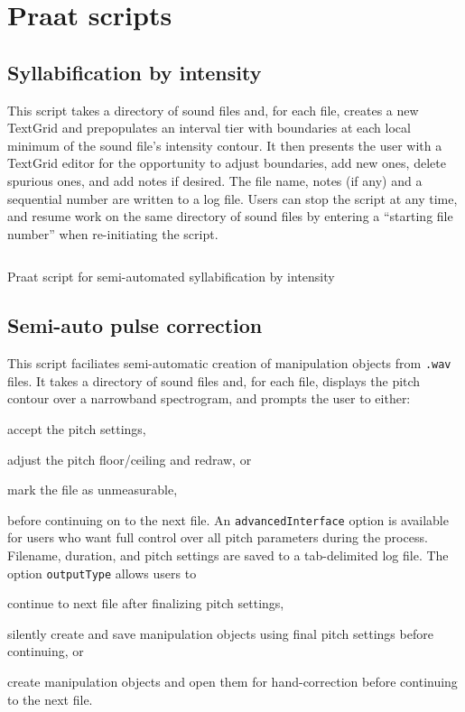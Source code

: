 \chapter{Praat scripts\label{apx:PraatScripts}}

\section{Syllabification by intensity}
This script takes a directory of sound files and, for each file, creates a new TextGrid and prepopulates an interval tier with boundaries at each local minimum of the sound file’s intensity contour.  It then presents the user with a TextGrid editor for the opportunity to adjust boundaries, add new ones, delete spurious ones, and add notes if desired.  The file name, notes (if any) and a sequential number are written to a log file.  Users can stop the script at any time, and resume work on the same directory of sound files by entering a “starting file number” when re-initiating the script.

\begin{code}
	\inputminted[fontsize=\footnotesize, tabsize=2]{r}{../scripts/CreateSyllableTierFromIntensity_DissVersion.praat}
	\caption[Syllabification by intensity]{Praat script for semi-automated syllabification by intensity\label{lst:SylInt}}
\end{code}
\newpage

\section{Semi-auto pulse correction}
This script faciliates semi-automatic creation of manipulation objects from \texttt{.wav} files.  It takes a directory of sound files and, for each file, displays the pitch contour over a narrowband spectrogram, and prompts the user to either:
\begin{inparaenum}
	\item accept the pitch settings, 
	\item adjust the pitch floor/ceiling and redraw, or
	\item mark the file as unmeasurable,
\end{inparaenum}
before continuing on to the next file.  An \texttt{advancedInterface} option is available for users who want full control over all pitch parameters during the process.  Filename, duration, and pitch settings are saved to a tab-delimited log file.  The option \texttt{outputType} allows users to 
\begin{inparaenum}
\item continue to next file after finalizing pitch settings,
\item silently create and save manipulation objects using final pitch settings before continuing, or
\item create manipulation objects and open them for hand-correction before continuing to the next file.
\end{inparaenum}  

